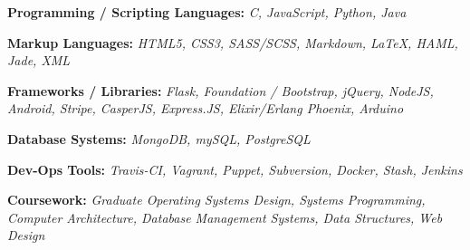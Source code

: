 \documentclass[12pt,a4paper,sans]{moderncv} %
\begin{document}
\begin{itemize}

\item{\textbf{Programming / Scripting Languages:} \textit{C, JavaScript, Python, Java}

\small{}}

\vspace{6pt}

\item{\textbf{Markup Languages:}\textit{ HTML5, CSS3, SASS/SCSS, Markdown, LaTeX, HAML, Jade, XML }

\vspace{3pt}

\small{}}

\vspace{6pt}

\item{\textbf{Frameworks / Libraries:}\textit{ Flask, Foundation / Bootstrap, jQuery, NodeJS, Android, Stripe, CasperJS, Express.JS, Elixir/Erlang Phoenix, Arduino}

\vspace{3pt}

\item{\textbf{Database Systems:}\textit{ MongoDB, mySQL, PostgreSQL} }

\vspace{3pt}

\small{}}

\vspace{6pt}

\item{\textbf{Dev-Ops Tools:}\textit{ Travis-CI, Vagrant, Puppet, Subversion, Docker, Stash, Jenkins}

\vspace{3pt}

\small{}}

\vspace{6pt}

\item{\textbf{Coursework:}\textit{ Graduate Operating Systems Design, Systems Programming, Computer Architecture, Database Management Systems, Data Structures, Web Design} }

\vspace{3pt}

\small{}

\vspace{6pt}

\end{itemize}

\vspace{10pt}
\end{document}
